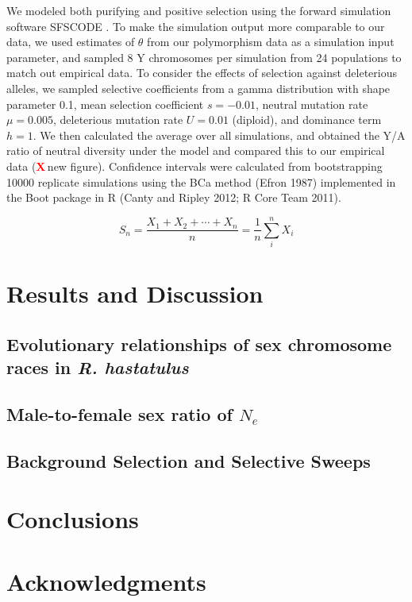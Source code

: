 \documentclass[9pt,twocolumn,twoside]{gsajnl}
\newcommand{\X}{\textcolor{red}{\bf X\,}}
\begin{document}
We modeled both purifying and positive selection using the forward simulation software SFSCODE \citep{hernandez2008flexible}. To make the simulation output more comparable to our data, we used estimates of $\theta$ from our polymorphism data as a simulation input parameter, and sampled 8 Y chromosomes per simulation from 24 populations to match out empirical data. To consider the effects of selection against deleterious alleles, we sampled selective coefficients from a gamma distribution with shape parameter 0.1, mean selection coefficient $s=-0.01$, neutral mutation rate $\mu = 0.005$, deleterious mutation rate $U=0.01$ (diploid), and dominance term $h=1$. We then calculated the average \theta over all simulations, and obtained the Y/A ratio of neutral diversity under the model and compared this to our empirical data (\X new figure). Confidence intervals were calculated from bootstrapping 10000 replicate simulations  using the BCa method (Efron 1987) implemented in the Boot package in R (Canty and Ripley 2012; R Core Team 2011). 

\begin{equation}
S_n = \frac{X_1 + X_2 + \cdots + X_n}{n}
      = \frac{1}{n}\sum_{i}^{n} X_i
\label{eq:refname1}
\end{equation}


\section*{Results and Discussion}

\subsection*{Evolutionary relationships of sex chromosome races in \textit{R. hastatulus}}

\subsection*{Male-to-female sex ratio of $N_{e}$}

\subsection*{Background Selection and Selective Sweeps}

\section*{Conclusions}
\section*{Acknowledgments}



\end{document}
